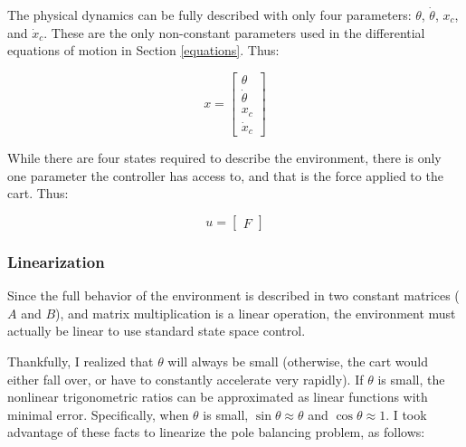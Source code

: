 \documentclass[12pt]{article}
\begin{document}
The physical dynamics can be fully described with only four parameters: $\theta$, $\dot \theta$, $x _c$, and $\dot x _c$. These are the only non-constant parameters used in the differential equations of motion in Section \ref{equations}. Thus:

\begin{equation}
    \displaystyle x = \begin{bmatrix}
        \theta \\
        \dot \theta \\
        x _c \\
        \dot x _c
    \end{bmatrix}
\end{equation}

While there are four states required to describe the environment, there is only one parameter the controller has access to, and that is the force applied to the cart. Thus:

\begin{equation}
    u = \begin{bmatrix}
        F
    \end{bmatrix}
\end{equation}

\subsubsection{Linearization}

Since the full behavior of the environment is described in two constant matrices ($A$ and $B$), and matrix multiplication is a linear operation, the environment must actually be linear to use standard state space control.

Thankfully, I realized that $\theta$ will always be small (otherwise, the cart would either fall over, or have to constantly accelerate very rapidly). If $\theta$ is small, the nonlinear trigonometric ratios can be approximated as linear functions with minimal error. Specifically, when $\theta$ is small, $\sin \theta \approx \theta$ and $\cos \theta \approx 1$. I took advantage of these facts to linearize the pole balancing problem, as follows:
\end{document}
